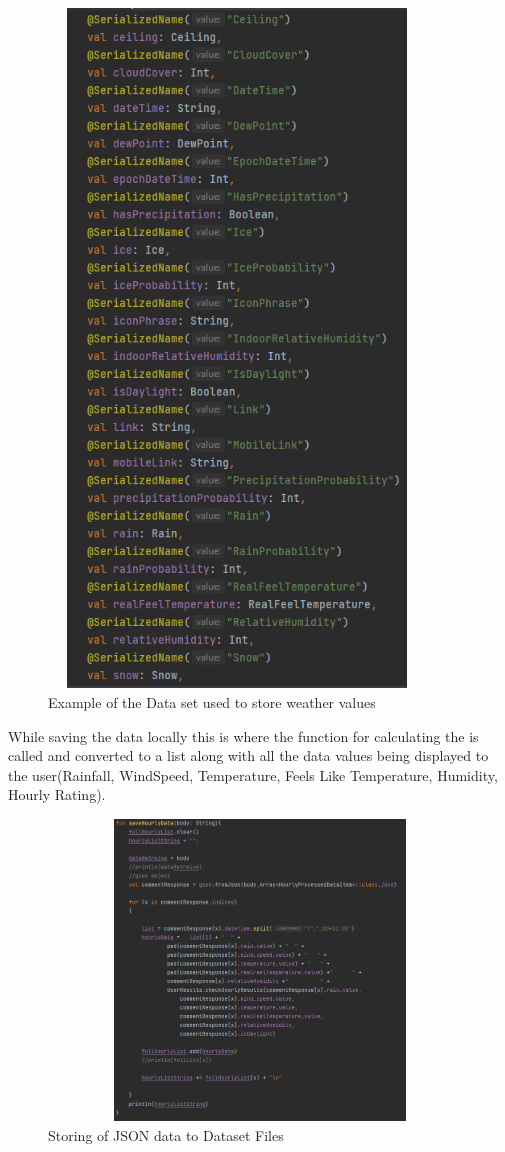 \begin{figure}[H]
    \centering
    \includegraphics[width=10cm,height = 18cm]{img/DataExample.PNG}
    \caption{Example of the Data set used to store weather values}
    \label{fig:altas config}
\end{figure}

While saving the data locally this is where the function for calculating the is called and converted to a list along with all the data values being displayed to the user(Rainfall, WindSpeed, Temperature, Feels Like Temperature, Humidity, Hourly Rating).

\begin{figure}[H]
    \centering
    \includegraphics[width=12cm,height = 8cm]{img/DataStore.PNG}
    \caption{Storing of JSON data to Dataset Files}
    \label{fig:altas config}
\end{figure}


